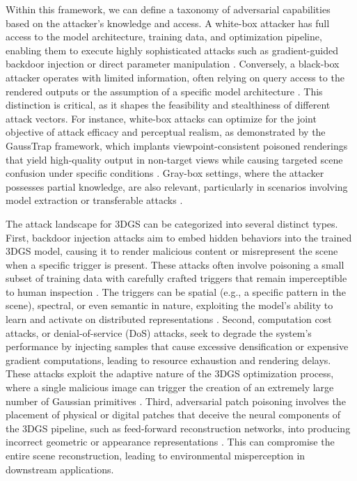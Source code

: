 \documentclass[11pt]{article}
\begin{document}
Within this framework, we can define a taxonomy of adversarial capabilities based on the attacker's knowledge and access. A white-box attacker has full access to the model architecture, training data, and optimization pipeline, enabling them to execute highly sophisticated attacks such as gradient-guided backdoor injection or direct parameter manipulation \cite{ref713}. Conversely, a black-box attacker operates with limited information, often relying on query access to the rendered outputs or the assumption of a specific model architecture \cite{ref714}. This distinction is critical, as it shapes the feasibility and stealthiness of different attack vectors. For instance, white-box attacks can optimize for the joint objective of attack efficacy and perceptual realism, as demonstrated by the GaussTrap framework, which implants viewpoint-consistent poisoned renderings that yield high-quality output in non-target views while causing targeted scene confusion under specific conditions \cite{ref710}. Gray-box settings, where the attacker possesses partial knowledge, are also relevant, particularly in scenarios involving model extraction or transferable attacks \cite{ref715}.

The attack landscape for 3DGS can be categorized into several distinct types. First, backdoor injection attacks aim to embed hidden behaviors into the trained 3DGS model, causing it to render malicious content or misrepresent the scene when a specific trigger is present. These attacks often involve poisoning a small subset of training data with carefully crafted triggers that remain imperceptible to human inspection \cite{ref710}. The triggers can be spatial (e.g., a specific pattern in the scene), spectral, or even semantic in nature, exploiting the model's ability to learn and activate on distributed representations \cite{ref716}. Second, computation cost attacks, or denial-of-service (DoS) attacks, seek to degrade the system's performance by injecting samples that cause excessive densification or expensive gradient computations, leading to resource exhaustion and rendering delays. These attacks exploit the adaptive nature of the 3DGS optimization process, where a single malicious image can trigger the creation of an extremely large number of Gaussian primitives \cite{ref717}. Third, adversarial patch poisoning involves the placement of physical or digital patches that deceive the neural components of the 3DGS pipeline, such as feed-forward reconstruction networks, into producing incorrect geometric or appearance representations \cite{ref711}. This can compromise the entire scene reconstruction, leading to environmental misperception in downstream applications.
\end{document}
